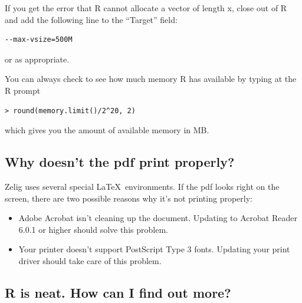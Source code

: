 If you get the error that R cannot allocate a vector of length x,
close out of R and add the following line to the ``Target'' field:  
\begin{verbatim}
--max-vsize=500M
\end{verbatim}
or as appropriate.  

You can always check to see how much memory R has available by typing
at the R prompt
\begin{verbatim}
> round(memory.limit()/2^20, 2)
\end{verbatim}
which gives you the amount of available memory in MB.  




\subsection*{Why doesn't the pdf print properly?} 

Zelig uses several special \LaTeX\ environments.  If the pdf looks right
on the screen, there are two possible reasons why it's not printing
properly:  
\begin{itemize}
\item Adobe Acrobat isn't cleaning up the document.  Updating to
  Acrobat Reader 6.0.1 or higher should solve this problem.  
\item Your printer doesn't support PostScript Type 3 fonts.  Updating
  your print driver should take care of this problem.  
\end{itemize}

\subsection*{R is neat.  How can I find out more?}

